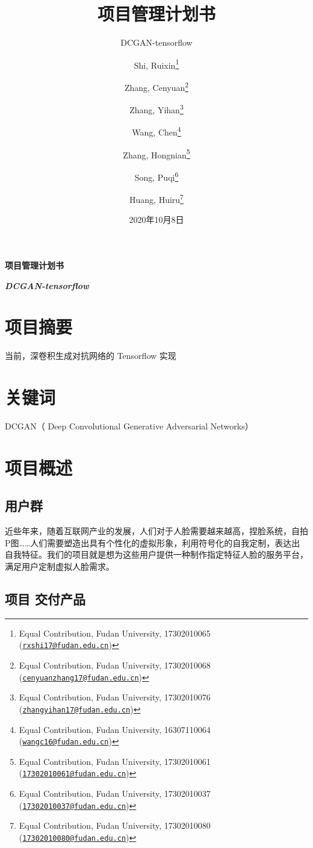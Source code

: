 \documentclass[
  hyperref, a4paper]{ctexart}
\title{\vspace{2in} 项目管理计划书}
\subtitle{DCGAN-tensorflow}
\author{Shi, Ruixin\footnote{Equal Contribution, Fudan University, 17302010065
  (\href{mailto:rxshi17@fudan.edu.cn}{\nolinkurl{rxshi17@fudan.edu.cn}})} \and Zhang, Cenyuan\footnote{Equal Contribution, Fudan University,
  17302010068
  (\href{mailto:cenyuanzhang17@fudan.edu.cn}{\nolinkurl{cenyuanzhang17@fudan.edu.cn}})} \and Zhang, Yihan\footnote{Equal Contribution, Fudan University, 17302010076
  (\href{mailto:zhangyihan17@fudan.edu.cn}{\nolinkurl{zhangyihan17@fudan.edu.cn}})} \and Wang, Chen\footnote{Equal Contribution, Fudan University, 16307110064
  (\href{mailto:wangc16@fudan.edu.cn}{\nolinkurl{wangc16@fudan.edu.cn}})} \and Zhang, Hongnian\footnote{Equal Contribution, Fudan University,
  17302010061
  (\href{mailto:17302010061@fudan.edu.cn}{\nolinkurl{17302010061@fudan.edu.cn}})} \and Song, Puqi\footnote{Equal Contribution, Fudan University, 17302010037
  (\href{mailto:17302010037@fudan.edu.cn}{\nolinkurl{17302010037@fudan.edu.cn}})} \and Huang, Huiru\footnote{Equal Contribution, Fudan University, 17302010080
  (\href{mailto:17302010080@fudan.edu.cn}{\nolinkurl{17302010080@fudan.edu.cn}})}}
\date{2020年10月8日}
\begin{document}
\maketitle

\newpage

\LARGE

\begin{center}
\textbf{项目管理计划书}
\end{center}

\large
\begin{center}
\textbf{\emph{DCGAN-tensorflow}}
\end{center}

\hypertarget{ux9879ux76eeux6458ux8981}{%
\section*{项目摘要}\label{ux9879ux76eeux6458ux8981}}

当前，深卷积生成对抗网络的 Tensorflow 实现

\hypertarget{ux5173ux952eux8bcd}{%
\section*{关键词}\label{ux5173ux952eux8bcd}}

DCGAN（ Deep Convolutional Generative Adversarial Networks）

\normalsize

\newpage

\tableofcontents

\newpage

\hypertarget{ux9879ux76eeux6982ux8ff0}{%
\section{项目概述}\label{ux9879ux76eeux6982ux8ff0}}

\hypertarget{ux7528ux6237ux7fa4}{%
\subsection{用户群}\label{ux7528ux6237ux7fa4}}

近些年来，随着互联网产业的发展，人们对于人脸需要越来越高，捏脸系统，自拍P图\ldots\ldots 人们需要塑造出具有个性化的虚拟形象，利用符号化的自我定制，表达出自我特征。我们的项目就是想为这些用户提供一种制作指定特征人脸的服务平台，满足用户定制虚拟人脸需求。

\hypertarget{ux9879ux76ee-ux4ea4ux4ed8ux4ea7ux54c1}{%
\subsection{项目 交付产品}\label{ux9879ux76ee-ux4ea4ux4ed8ux4ea7ux54c1}}
\end{document}
